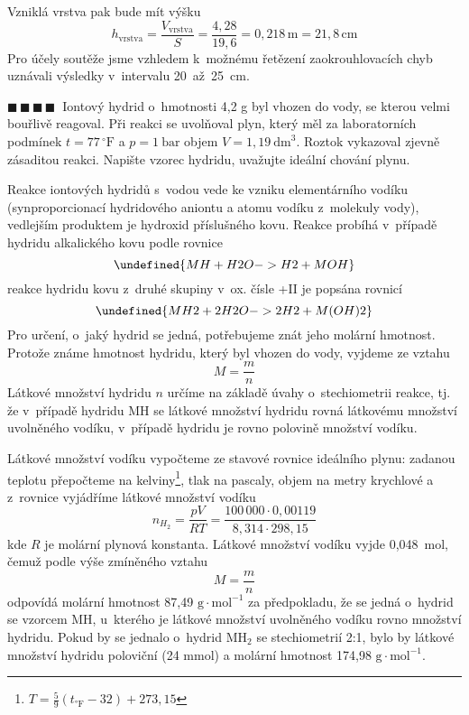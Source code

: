 \documentclass{book}
\let\ch\undefined
\newcommand{\ctyri}{$\blacksquare \, \blacksquare \, \blacksquare \, \blacksquare \; \; $}
\renewenvironment{quotation}{\par}{\par} %
\begin{document}
\newpage %

 Vzniklá vrstva pak bude mít výšku 
\[
h_{\mathrm{vrstva}}=\frac{V_{\mathrm{vrstva}}}{S}=\frac{4,28}{19,6}=0,218\,\mathrm{m}=21,8\,\mathrm{cm}
\]
Pro účely soutěže jsme vzhledem k~možnému řetězení zaokrouhlovacích
chyb uznávali výsledky v~intervalu 20~až~25~cm.

\hrulefill %
\begin{quotation}
\ctyri Iontový hydrid o~hmotnosti 4,2 g byl vhozen do vody, se kterou velmi
bouřlivě reagoval. Při reakci se uvolňoval plyn, který měl za laboratorních
podmínek $t = 77\,^{\circ}\mathrm{F}$ a $p = 1~\mathrm{bar}$ objem $V = 1,19~\mathrm{dm}^{3}$. Roztok vykazoval
zjevně zásaditou reakci. Napište vzorec hydridu, uvažujte ideální
chování plynu.
\end{quotation} \dotfill \par 
Reakce iontových hydridů s~vodou vede ke vzniku elementárního
vodíku (synproporcionací hydridového aniontu a atomu vodíku z~molekuly
vody), vedlejším produktem je hydroxid příslušného kovu. Reakce probíhá
v~případě hydridu alkalického kovu podle rovnice
\shorthandoff{-}
\[
\ch{MH + H2O -> H2 + MOH}
\]
\shorthandon{-}
reakce hydridu kovu z~druhé skupiny v~ox. čísle +II je popsána rovnicí
\shorthandoff{-}
\[
\ch{MH2 + 2 H2O -> 2 H2 + M(OH)2}
\]
\shorthandon{-} 
Pro určení, o~jaký hydrid se jedná, potřebujeme znát jeho molární
hmotnost. Protože známe hmotnost hydridu, který byl vhozen do vody,
vyjdeme ze vztahu
\[
M=\frac{m}{n}
\]
Látkové množství hydridu $n$ určíme na základě
úvahy o~stechiometrii reakce, tj. že v~případě hydridu MH se látkové
množství hydridu rovná látkovému množství uvolněného vodíku, v~případě
hydridu \ch{MH2} je rovno polovině množství vodíku. 

Látkové množství vodíku vypočteme ze stavové rovnice ideálního plynu: zadanou teplotu přepočteme
na kelviny\footnote{$T=\frac{5}{9} (t_{\text{°F}} - 32) + 273,15$}, tlak na pascaly, objem na metry krychlové a z~rovnice
vyjádříme látkové množství vodíku
\[
n_{H_2}=\frac{pV}{RT}=\frac{100\,000\cdot 0,00119}{8,314\cdot 298,15}
\]
kde $R$ je molární plynová
konstanta. Látkové množství vodíku vyjde 0,048~mol, čemuž podle výše zmíněného vztahu
\[
M=\frac{m}{n}
\]
odpovídá molární hmotnost 87,49 $\mathrm{g\cdot mol^{-1}}$ za předpokladu,
že se jedná o~hydrid se vzorcem MH, u~kterého je látkové množství
uvolněného vodíku rovno množství hydridu. Pokud by se jednalo o~hydrid MH$_2$ se stechiometrií 2:1, bylo by látkové množství hydridu poloviční (24 mmol) a molární hmotnost 174,98 $\mathrm{g\cdot mol^{-1}}$. 
\end{document}
